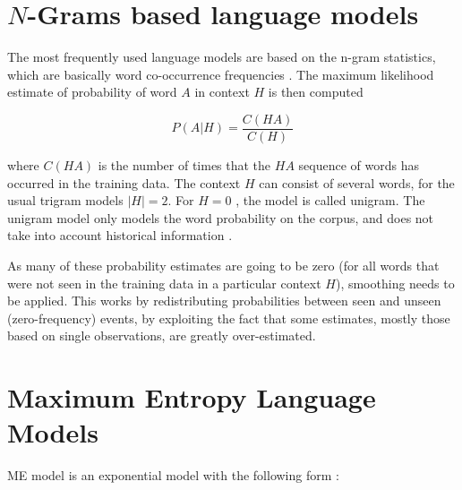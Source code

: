 \section{$N$-Grams based language models}
\label{sec:n-gram-lm}

The most frequently used language models are based on the n-gram statistics, which are basically word co-occurrence frequencies\cite{Manning:1999:FSN:311445} . The maximum likelihood estimate of probability of word $A$ in context $H$ is then computed


\begin{equation}
\label{eq:ngram-prob}
  P(A|H) = \frac{C(HA)}{C(H)}
\end{equation}

where $C(HA)$ is the number of times that the $HA$ sequence of words has
occurred in the training data. The context $H$ can consist of several words,
for the usual trigram models $|H| = 2$. For $H = 0$ , the model is called
unigram. The unigram model only models the word probability on the corpus,
and does not take into account historical information
\cite{Manning:1999:FSN:311445, mikolovphd2012}. 

As many of these probability estimates are going to be zero (for all words that were not seen in the training data in a particular context $H$), smoothing needs to be applied. This works by redistributing probabilities between seen and unseen (zero-frequency) events, by exploiting the fact that some estimates, mostly those based on single observations, are greatly over-estimated. 


\section{Maximum Entropy Language Models}
\label{sec:max-ent-lm}

\ac{ME} model is an exponential model with the following form :

